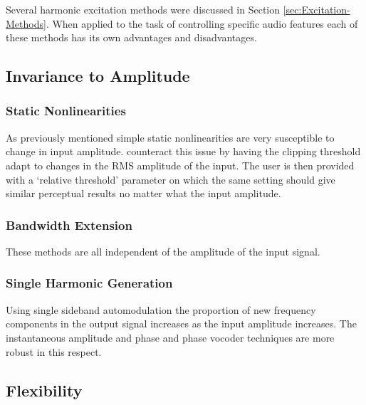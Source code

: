 
	Several harmonic excitation methods were discussed in Section \ref{sec:Excitation-Methods}. When applied to the task of controlling specific audio features each of these methods has its own advantages and disadvantages.

	\subsection{Invariance to Amplitude}
	\label{sec:FeatureControl-AmplitudeInvariance}

		\subsubsection*{Static Nonlinearities}		
			As previously mentioned simple static nonlinearities are very susceptible to change in input amplitude. \citet{deman2014adaptive} counteract this issue by having the clipping threshold adapt to changes in the RMS amplitude of the input. The user is then provided with a `relative threshold' parameter on which the same setting should give similar perceptual results no matter what the input amplitude.


		\subsubsection*{Bandwidth Extension}
			These methods are all independent of the amplitude of the input signal.
			
		\subsubsection*{Single Harmonic Generation}
			Using single sideband automodulation the proportion of new frequency components in the output signal increases as the input amplitude increases. The instantaneous amplitude and phase and phase vocoder techniques are more robust in this respect.

	\subsection{Flexibility}
	\label{sec:FeatureControl-Flexibility}


